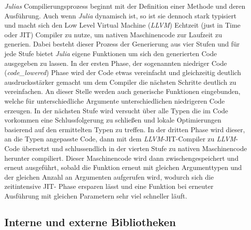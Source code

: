 \documentclass[proseminar,german,utf8]{zihpub}
\begin{document}
\textit{Julias} Compilierungsprozess beginnt mit der Definition einer Methode und deren Ausführung. Auch wenn \textit{Julia} dynamisch ist, so ist sie dennoch stark typisiert und macht sich den Low Level Virtual Machine (\textit{LLVM}) Echtzeit (just in Time oder JIT) Compiler zu nutze, um nativen Maschinencode zur Laufzeit zu generien. Dabei besteht dieser Prozess der Generierung aus vier Stufen und für jede Stufe bietet \textit{Julia} eigene Funktionen um sich den generierten Code ausgegeben zu lassen. In der ersten Phase, der sogenannten niedriger Code (\textit{code\_lowered}) Phase wird der Code etwas vereinfacht und gleichzeitig deutlich ausdrucksstärker gemacht um dem Compiler die nächsten Schritte deutlich zu vereinfachen. An dieser Stelle werden auch generische Funktionen eingebunden, welche für unterschiedliche Argumente unterschiedlichen niedrigeren Code erzeugen. In der nächsten Stufe wird versucht über alle Typen die im Code vorkommen eine Schlussfolgerung zu schließen und lokale Optimierungen basierend auf den ermittelten Typen zu treffen. In der dritten Phase wird dieser, an die Typen angepasste Code, dann mit dem \textit{LLVM}-JIT-Compiler zu \textit{LLVM}-Code übersetzt  und schlussendlich in der vierten Stufe zu nativen Maschinencode herunter compiliert. Dieser Maschinencode wird dann zwischengespeichert und erneut ausgeführt, sobald die Funktion erneut mit gleichen Argumenttypen und der gleichen Anzahl an Argumenten aufgerufen wird, wodurch sich die zeitintensive JIT- Phase ersparen lässt und eine Funktion bei erneuter Ausführung mit gleichen Parametern sehr viel schneller läuft.

\subsection{Interne und externe Bibliotheken}
\end{document}
